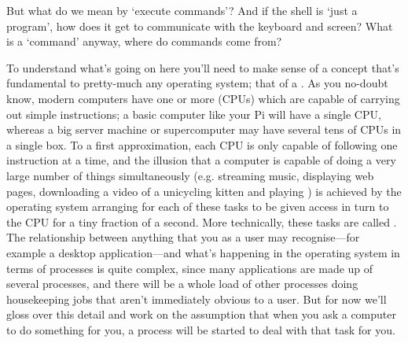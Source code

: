 But what do we mean by `execute commands'? And if the shell is `just a program', how does it get to communicate with the keyboard and screen? What is a `command' anyway, where do commands come from?

To understand what's going on here you'll need to make sense of a concept that's fundamental to pretty-much any operating system; that of a . As you no-doubt know, modern computers have one or more  (CPUs) which are capable of carrying out simple instructions; a basic computer like your Pi will have a single CPU, whereas a big server machine or supercomputer may have several tens of CPUs in a single box. To a first approximation, each CPU is only capable of following one instruction at a time, and the illusion that a computer is capable of doing a very large number of things simultaneously (e.g. streaming music, displaying web pages, downloading a video of a unicycling kitten and playing ) is achieved by the operating system arranging for each of these tasks to be given access in turn to the CPU for a tiny fraction of a second. More technically, these tasks are called . The relationship between anything that you as a user may recognise---for example a desktop application---and what's happening in the operating system in terms of processes is quite complex, since many applications are made up of several processes, and there will be a whole load of other processes doing housekeeping jobs that aren't immediately obvious to a user. But for now we'll gloss over this detail and work on the assumption that when you ask a computer to do something for you, a process will be started to deal with that task for you.

